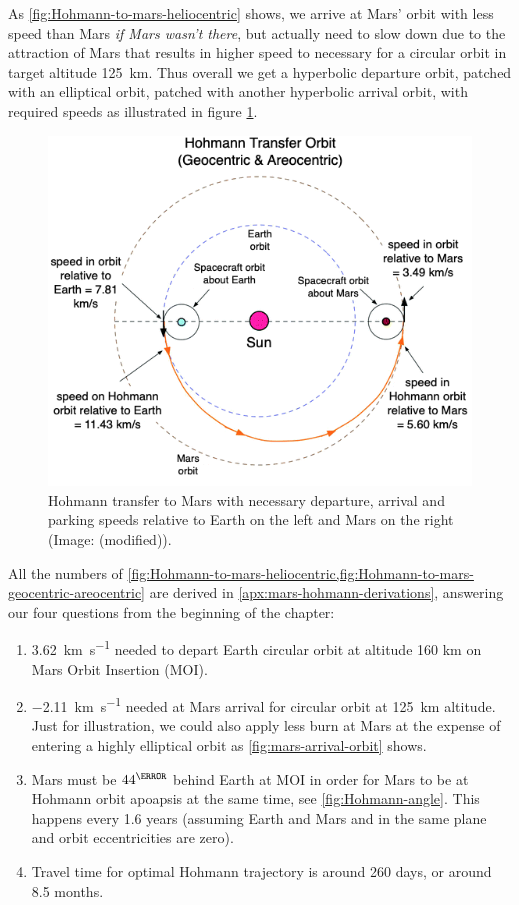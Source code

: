 As \cref{fig:Hohmann-to-mars-heliocentric} shows, we arrive at Mars' orbit with less speed than Mars \emph{if Mars wasn't there}, but actually need to slow down due to the attraction of Mars that results in higher speed to necessary for a circular orbit in target altitude \SI{125}{\km}. Thus overall we get a hyperbolic departure orbit, patched with an elliptical orbit, patched with another hyperbolic arrival orbit, with required speeds as illustrated in figure \cref{fig:Hohmann-to-mars-geocentric-areocentric}.

\begin{figure}[ht]
    \centering
    \includegraphics[width=0.7\linewidth]{fig/Hohmann-to-mars-geocentric-areocentric.png}
    \caption{Hohmann transfer to Mars with necessary departure, arrival and parking speeds relative to Earth on the left and Mars on the right (Image: \cite{Rapp2016} (modified)).}
    \label{fig:Hohmann-to-mars-geocentric-areocentric}
\end{figure}

All the numbers of \cref{fig:Hohmann-to-mars-heliocentric,fig:Hohmann-to-mars-geocentric-areocentric} are derived in \cref{apx:mars-hohmann-derivations}, answering our four questions from the beginning of the chapter:

\begin{enumerate}
	\item \SI{3.62}{\km\per\s} needed to depart Earth circular orbit at altitude 160 km on Mars Orbit Insertion (MOI).
	\item \SI{-2.11}{\km\per\s} needed at Mars arrival for circular orbit at \SI{125}{\km} altitude. Just for illustration, we could also apply less burn at Mars at the expense of entering a highly elliptical orbit as \cref{fig:mars-arrival-orbit} shows.
	\item Mars must be $44^\degree$ behind Earth at MOI in order for Mars to be at Hohmann orbit apoapsis at the same time, see \cref{fig:Hohmann-angle}. This happens every 1.6 years \cite{Odenwald} (assuming Earth and Mars and in the same plane and orbit eccentricities are zero).
	\item Travel time for optimal Hohmann trajectory is around 260 days, or around 8.5 months.
\end{enumerate}

